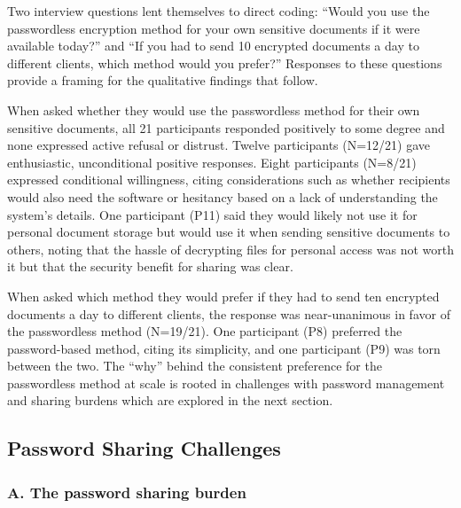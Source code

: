 Two interview questions lent themselves to direct coding: ``Would you use the passwordless encryption method for your own sensitive documents if it were available today?'' and ``If you had to send 10 encrypted documents a day to different clients, which method would you prefer?'' Responses to these questions provide a framing for the qualitative findings that follow.

When asked whether they would use the passwordless method for their own sensitive documents, all 21 participants responded positively to some degree and none expressed active refusal or distrust. Twelve participants (N=12/21) gave enthusiastic, unconditional positive responses. Eight participants (N=8/21) expressed conditional willingness, citing considerations such as whether recipients would also need the software or hesitancy based on a lack of understanding the system's details. One participant (P11) said they would likely not use it for personal document storage but would use it when sending sensitive documents to others, noting that the hassle of decrypting files for personal access was not worth it but that the security benefit for sharing was clear.

When asked which method they would prefer if they had to send ten encrypted documents a day to different clients, the response was near-unanimous in favor of the passwordless method (N=19/21). One participant (P8) preferred the password-based method, citing its simplicity, and one participant (P9) was torn between the two. The ``why'' behind the consistent preference for the passwordless method at scale is rooted in challenges with password management and sharing burdens which are explored in the next section.



\FloatBarrier
\subsection{Password Sharing Challenges}
\label{sec:password-sharing-challenges}

\subsubsection*{A. The password sharing burden}

